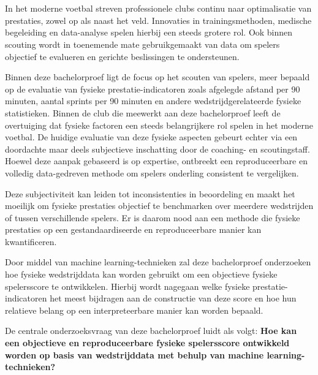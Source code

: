 
\chapter{}%
\label{ch:inleiding}

In het moderne voetbal streven professionele clubs continu naar optimalisatie van prestaties, zowel op als naast het veld. Innovaties in trainingsmethoden, medische begeleiding en data-analyse spelen hierbij een steeds grotere rol. Ook binnen scouting wordt in toenemende mate gebruikgemaakt van data om spelers objectief te evalueren en gerichte beslissingen te ondersteunen.

Binnen deze bachelorproef ligt de focus op het scouten van spelers, meer bepaald op de evaluatie van fysieke prestatie-indicatoren zoals afgelegde afstand per 90 minuten, aantal sprints per 90 minuten en andere wedstrijdgerelateerde fysieke statistieken. Binnen de club die meewerkt aan deze bachelorproef leeft de overtuiging dat fysieke factoren een steeds belangrijkere rol spelen in het moderne voetbal. De huidige evaluatie van deze fysieke aspecten gebeurt echter via een doordachte maar deels subjectieve inschatting door de coaching- en scoutingstaff. Hoewel deze aanpak gebaseerd is op expertise, ontbreekt een reproduceerbare en volledig data-gedreven methode om spelers onderling consistent te vergelijken.

Deze subjectiviteit kan leiden tot inconsistenties in beoordeling en maakt het moeilijk om fysieke prestaties objectief te benchmarken over meerdere wedstrijden of tussen verschillende spelers. Er is daarom nood aan een methode die fysieke prestaties op een gestandaardiseerde en reproduceerbare manier kan kwantificeren.

Door middel van machine learning-technieken zal deze bachelorproef onderzoeken hoe fysieke wedstrijddata kan worden gebruikt om een objectieve fysieke spelersscore te ontwikkelen. Hierbij wordt nagegaan welke fysieke prestatie-indicatoren het meest bijdragen aan de constructie van deze score en hoe hun relatieve belang op een interpreteerbare manier kan worden bepaald.

De centrale onderzoeksvraag van deze bachelorproef luidt als volgt: \textbf{Hoe kan een objectieve en reproduceerbare fysieke spelersscore ontwikkeld worden op basis van wedstrijddata met behulp van machine learning-technieken?}

